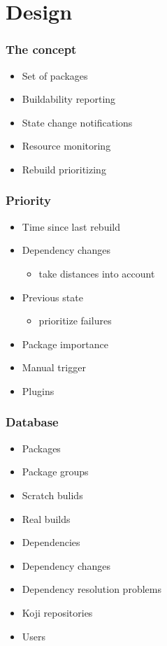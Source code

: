 \documentclass[pdftex,unicode,xcolor=table]{beamer}
\begin{document}
\section{Design}
\begin{frame}
  \frametitle{The concept}
  \begin{itemize}
  \item Set of packages
  \item Buildability reporting
  \item State change notifications
  \item Resource monitoring
  \item Rebuild prioritizing
  \end{itemize}
\end{frame}

\begin{frame}
  \frametitle{Priority}
  \begin{itemize}
    \item Time since last rebuild
    \item Dependency changes
    \begin{itemize}
      \item take distances into account
    \end{itemize}
    \item Previous state
    \begin{itemize}
      \item prioritize failures
    \end{itemize}
    \item Package importance
    \item Manual trigger
    \item Plugins
  \end{itemize}
\end{frame}

\begin{frame}
  \frametitle{Database}
  \begin{itemize}
    \item Packages
    \item Package groups
    \item Scratch bulids
    \item Real builds
    \item Dependencies
    \item Dependency changes
    \item Dependency resolution problems
    \item Koji repositories
    \item Users
  \end{itemize}
\end{frame}
\end{document}
